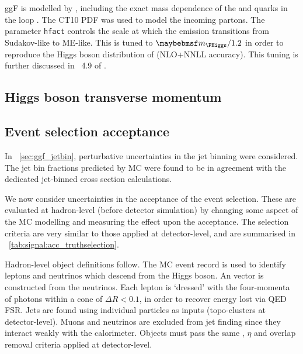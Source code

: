 
\ac{ggF} is modelled by , including the exact mass 
dependence of the \Ptop and \Pbottom quarks in the loop \cite{Powheg-ggF-quarkmasses}. 
The CT10 PDF \cite{CTEQ} was used to model the incoming partons.
The \powhegbox parameter \verb|hfact| controls the scale at which the emission 
transitions from Sudakov-like to ME-like. This is tuned to $\mH/1.2$ in order to 
reproduce the Higgs boson \pt distribution of \hqt \cite{HqT2} (NLO+NNLL accuracy). This 
tuning is further discussed in \Section~4.9 of \Reference \cite{YR2}.



\subsection{Higgs boson transverse momentum}



\subsection{Event selection acceptance}

In \Section~\ref{sec:ggf_jetbin}, perturbative uncertainties in the jet binning were 
considered. The jet bin fractions predicted by MC were found to be in agreement with the 
dedicated jet-binned cross section calculations. 

We now consider uncertainties in the acceptance of the event selection. These are 
evaluated at hadron-level (\ie before detector simulation) by changing some aspect of 
the MC modelling and measuring the effect upon the acceptance. The selection criteria are 
very similar to those applied at detector-level, and are summarised in 
\Table~\ref{tab:signal:acc_truthselection}.

Hadron-level object definitions follow. The MC event record is used to identify leptons 
and neutrinos which descend from the Higgs boson. An \metvec vector is constructed from 
the neutrinos. Each lepton is `dressed' with the four-momenta of photons within a cone of 
$\Delta R < 0.1$, in order to recover energy lost via QED FSR. Jets are found using 
individual particles as inputs (\cf topo-clusters at detector-level). Muons and neutrinos 
are excluded from jet finding since they interact weakly with the calorimeter. Objects 
must pass the same \pt, $\eta$ and overlap removal criteria applied at detector-level.

